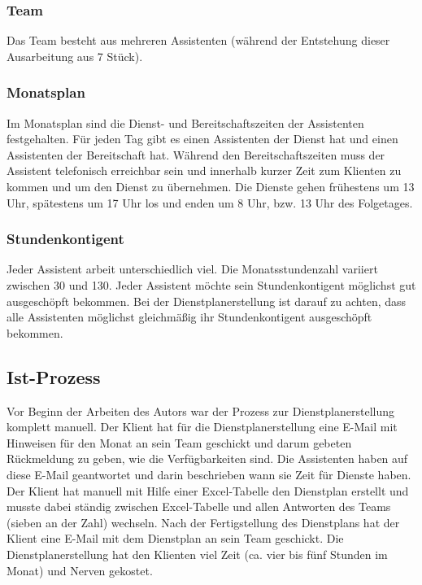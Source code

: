 \documentclass[12pt,a4paper,titlepage]{article} %
\begin{document}
\subsubsection{Team}
Das Team besteht aus mehreren Assistenten (während der Entstehung dieser Ausarbeitung aus 7 Stück).

\subsubsection{Monatsplan}
Im Monatsplan sind die Dienst- und Bereitschaftszeiten der Assistenten festgehalten. Für jeden Tag gibt es einen Assistenten der Dienst hat und einen Assistenten der Bereitschaft hat. Während den Bereitschaftszeiten muss der Assistent telefonisch erreichbar sein und innerhalb kurzer Zeit zum Klienten zu kommen und um den Dienst zu übernehmen. Die Dienste gehen frühestens um 13 Uhr, spätestens um 17 Uhr los und enden um 8 Uhr, bzw. 13 Uhr des Folgetages. 

\subsubsection{Stundenkontigent}
Jeder Assistent arbeit unterschiedlich viel. Die Monatsstundenzahl variiert zwischen 30 und 130. Jeder Assistent möchte sein Stundenkontigent möglichst gut ausgeschöpft bekommen. Bei der Dienstplanerstellung ist darauf zu achten, dass alle Assistenten möglichst gleichmäßig ihr Stundenkontigent ausgeschöpft bekommen. %

\subsection{Ist-Prozess}
Vor Beginn der Arbeiten des Autors war der Prozess zur Dienstplanerstellung komplett manuell. Der Klient hat für die Dienstplanerstellung eine E-Mail mit Hinweisen für den Monat an sein Team geschickt und darum gebeten Rückmeldung zu geben, wie die Verfügbarkeiten sind.
Die Assistenten haben auf diese E-Mail geantwortet und darin beschrieben wann sie Zeit für Dienste haben.
Der Klient hat manuell mit Hilfe einer Excel-Tabelle den Dienstplan erstellt und musste dabei ständig zwischen Excel-Tabelle und allen Antworten des Teams (sieben an der Zahl) wechseln. Nach der Fertigstellung des Dienstplans hat der Klient eine E-Mail mit dem Dienstplan an sein Team geschickt.
Die Dienstplanerstellung hat den Klienten viel Zeit (ca. vier bis fünf Stunden im Monat) und Nerven gekostet.
\end{document}
